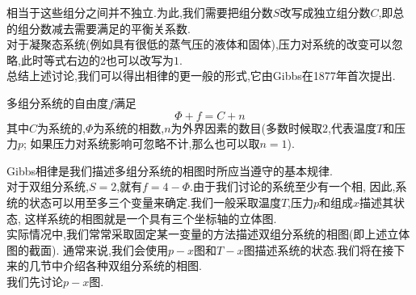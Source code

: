\documentclass{ctexart}
\begin{document}
相当于这些组分之间并不独立.为此,我们需要把组分数$S$改写成独立组分数$C$,即总的组分数减去需要满足的平衡关系数.\\
\indent 对于凝聚态系统(例如具有很低的蒸气压的液体和固体),压力对系统的改变可以忽略,此时等式右边的$2$也可以改写为$1$.\\
\indent 总结上述讨论,我们可以得出相律的更一般的形式,它由Gibbs在1877年首次提出.
\begin{theorem}[4D.1.2 Gibbs相律]
    多组分系统的自由度$f$满足
    \[\varPhi+f=C+n\]
    其中$C$为系统的,$\varPhi$为系统的相数,$n$为外界因素的数目(多数时候取$2$,代表温度$T$和压力$p$;%
    如果压力对系统影响可忽略不计,那么也可以取$n=1$).
\end{theorem}
Gibbs相律是我们描述多组分系统的相图时所应当遵守的基本规律.\\
\indent 对于双组分系统,$S=2$,就有$f=4-\varPhi$.由于我们讨论的系统至少有一个相,%
因此,系统的状态可以用至多三个变量来确定.我们一般采取温度$T$,压力$p$和组成$x$描述其状态,%
这样系统的相图就是一个具有三个坐标轴的立体图.\\
\indent 实际情况中,我们常常采取固定某一变量的方法描述双组分系统的相图(即上述立体图的截面).%
通常来说,我们会使用$p-x$图和$T-x$图描述系统的状态.我们将在接下来的几节中介绍各种双组分系统的相图.\vspace{12pt}\\
\indent 我们先讨论$p-x$图.
\end{document}
